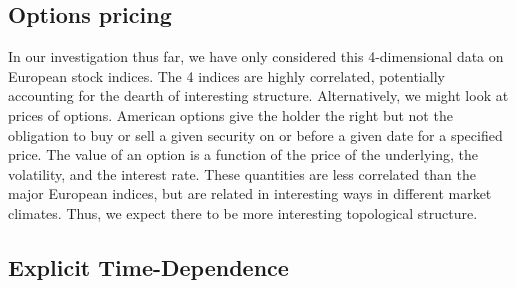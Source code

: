 \documentclass{article}
\begin{document}
\subsection{Options pricing}
In our investigation thus far, we have only considered this 4-dimensional data on European stock indices. The 4 indices are highly correlated, potentially accounting for the dearth of interesting structure. Alternatively, we might look at prices of options. American options give the holder the right but not the obligation to buy or sell a given security on or before a given date for a specified price. The value of an option is a function of the price of the underlying, the volatility, and the interest rate. These quantities are less correlated than the major  European indices, but are related in interesting ways in different market climates. Thus, we expect there to be more interesting topological structure.

\subsection{Explicit Time-Dependence}

\nocite{*}


\end{document}
